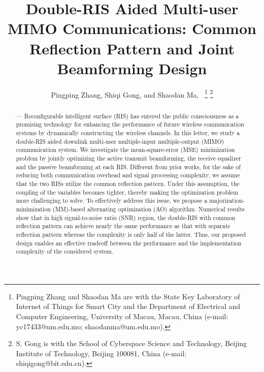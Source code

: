 \documentclass[journal]{IEEEtran}
\begin{document}
\title{{\LARGE Double-RIS Aided
Multi-user MIMO Communications: Common Reflection Pattern and Joint Beamforming Design}}

\author{Pingping Zhang, Shiqi Gong, and Shaodan Ma,~
\thanks{Pingping Zhang and Shaodan Ma are with the State Key Laboratory of Internet of Things for Smart City and the Department of Electrical and Computer Engineering, University of Macau, Macau, China (e-mail: yc17433@um.edu.mo; shaodanma@um.edu.mo).}
\thanks{S. Gong is with the School of Cyberspace Science and Technology, Beijing Institute of Technology, Beijing 100081, China (e-mail: shiqigong@bit.edu.cn).}}



\maketitle
\begin{abstract}
    — 
    Reconfigurable intelligent
surface (RIS) has entered the public consciousness
 as a promising technology for enhancing the performance of future wireless communication systems by dynamically constructing the wireless channels.
In this letter, we study a double-RIS aided downlink multi-user multiple-input multiple-output (MIMO) communication system. We investigate the mean-square-error (MSE) minimization problem by jointly optimizing the active transmit beamforming, the receive equalizer and the passive beamforming at each RIS. Different from prior works, for the sake  of reducing both communication overhead  and signal processing complexity, we assume that the two RISs utilize the common reflection pattern. Under this assumption, the coupling of the variables becomes tighter, thereby making the optimization problem more challenging to solve. To effectively address this issue, we propose a majorization-minimization (MM)-based alternating optimization (AO) algorithm.
 Numerical results show that in high signal-to-noise ratio (SNR) region, the double-RIS with common reflection pattern can achieve nearly the same performance as 
that with separate reflection pattern whereas the  complexity is only half of the latter. Thus, our proposed design enables an effective tradeoff between the  performance  and  the  implementation complexity of the considered system.
\end{abstract}
\end{document}
